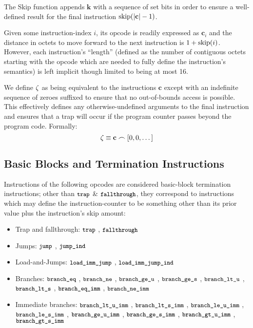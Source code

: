The Skip function appends $\mathbf{k}$ with a sequence of set bits in order to ensure a well-defined result for the final instruction $\text{skip}(|\mathbf{c}| - 1)$.

Given some instruction-index $i$, its opcode is readily expressed as $\mathbf{c}_i$ and the distance in octets to move forward to the next instruction is $1 + \text{skip}(i)$. However, each instruction's ``length'' (defined as the number of contiguous octets starting with the opcode which are needed to fully define the instruction's semantics) is left implicit though limited to being at most 16.

We define $\zeta$ as being equivalent to the instructions $\mathbf{c}$ except with an indefinite sequence of zeroes suffixed to ensure that no out-of-bounds access is possible. This effectively defines any otherwise-undefined arguments to the final instruction and ensures that a trap will occur if the program counter passes beyond the program code. Formally:
\begin{equation}\label{eq:instructions}
  \instructions \equiv \mathbf{c} \concat \sq{0, 0, \dots}
\end{equation}

\subsection{Basic Blocks and Termination Instructions}

Instructions of the following opcodes are considered basic-block termination instructions; other than $\text{{\small \texttt{trap}}}$ \& $\text{{\small \texttt{fallthrough}}}$, they correspond to instructions which may define the instruction-counter to be something other than its prior value plus the instruction's skip amount:
\begin{itemize}
  \item Trap and fallthrough: $\text{{\small \texttt{trap}}}$
  , $\text{{\small \texttt{fallthrough}}}$
  \item Jumps: $\text{{\small \texttt{jump}}}$
  , $\text{{\small \texttt{jump\_ind}}}$
  \item Load-and-Jumps: $\text{{\small \texttt{load\_imm\_jump}}}$
  , $\text{{\small \texttt{load\_imm\_jump\_ind}}}$
  \item Branches: $\text{{\small \texttt{branch\_eq}}}$
  , $\text{{\small \texttt{branch\_ne}}}$
  , $\text{{\small \texttt{branch\_ge\_u}}}$
  , $\text{{\small \texttt{branch\_ge\_s}}}$
  , $\text{{\small \texttt{branch\_lt\_u}}}$
  , $\text{{\small \texttt{branch\_lt\_s}}}$
  , $\text{{\small \texttt{branch\_eq\_imm}}}$
  , $\text{{\small \texttt{branch\_ne\_imm}}}$
  \item Immediate branches: $\text{{\small \texttt{branch\_lt\_u\_imm}}}$
  , $\text{{\small \texttt{branch\_lt\_s\_imm}}}$
  , $\text{{\small \texttt{branch\_le\_u\_imm}}}$
  , $\text{{\small \texttt{branch\_le\_s\_imm}}}$
  , $\text{{\small \texttt{branch\_ge\_u\_imm}}}$
  , $\text{{\small \texttt{branch\_ge\_s\_imm}}}$
  , $\text{{\small \texttt{branch\_gt\_u\_imm}}}$
  , $\text{{\small \texttt{branch\_gt\_s\_imm}}}$
\end{itemize}

